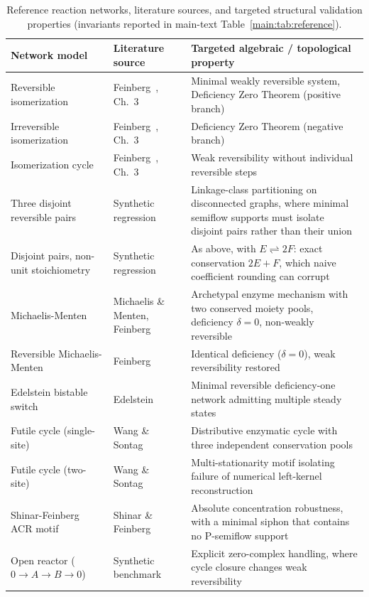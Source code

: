\documentclass[pdflatex,referee]{../template/sn-jnl}
\theoremstyle{plain}%
\theoremstyle{definition}%
\theoremstyle{remark}%
\begin{document}
\begin{table}[htbp]
\centering
\caption{Reference reaction networks, literature sources, and targeted structural validation properties (invariants reported in main-text Table~\ref*{main:tab:reference}).}
\label{tab:si_validation_sources}
\footnotesize
\begin{tabularx}{\linewidth}{@{}lXX@{}}
\toprule
\textbf{Network model} & \textbf{Literature source} & \textbf{Targeted algebraic / topological property} \\
\midrule
Reversible isomerization & Feinberg~\cite{feinberg2019foundations}, Ch.~3 & Minimal weakly reversible system, Deficiency Zero Theorem (positive branch) \\
Irreversible isomerization & Feinberg~\cite{feinberg2019foundations}, Ch.~3 & Deficiency Zero Theorem (negative branch) \\
Isomerization cycle & Feinberg~\cite{feinberg2019foundations}, Ch.~3 & Weak reversibility without individual reversible steps \\
Three disjoint reversible pairs & Synthetic regression & Linkage-class partitioning on disconnected graphs, where minimal semiflow supports must isolate disjoint pairs rather than their union \\
Disjoint pairs, non-unit stoichiometry & Synthetic regression & As above, with $E \rightleftharpoons 2F$: exact conservation $2E+F$, which naive coefficient rounding can corrupt \\
Michaelis-Menten & Michaelis \& Menten, Feinberg~\cite{feinberg2019foundations} & Archetypal enzyme mechanism with two conserved moiety pools, deficiency $\delta=0$, non-weakly reversible \\
Reversible Michaelis-Menten & Feinberg~\cite{feinberg2019foundations} & Identical deficiency ($\delta=0$), weak reversibility restored \\
Edelstein bistable switch & Edelstein~\cite{edelstein1970biochemical} & Minimal reversible deficiency-one network admitting multiple steady states \\
Futile cycle (single-site) & Wang \& Sontag~\cite{wang2008multisite} & Distributive enzymatic cycle with three independent conservation pools \\
Futile cycle (two-site) & Wang \& Sontag~\cite{wang2008multisite} & Multi-stationarity motif isolating failure of numerical left-kernel reconstruction \\
Shinar-Feinberg ACR motif & Shinar \& Feinberg~\cite{shinar2010structural} & Absolute concentration robustness, with a minimal siphon that contains no P-semiflow support \\
Open reactor ($0 \to A \to B \to 0$) & Synthetic benchmark & Explicit zero-complex handling, where cycle closure changes weak reversibility \\
\bottomrule
\end{tabularx}
\end{table}
\end{document}
